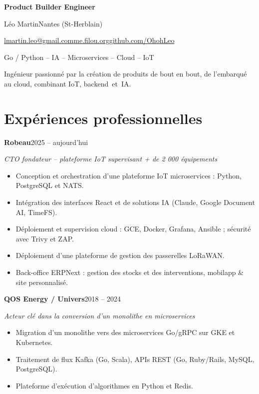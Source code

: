 \documentclass[a4paper,10pt]{article}
\newcommand{\experience}[3]{\textbf{#1}\hfill{\small\color{muted}#2}\par\textit{#3}\par}
\newcommand{\experiencegap}{\vspace{8pt plus 1fill}}
\begin{document}
{\fontsize{27}{30}\selectfont\bfseries Product Builder Engineer}\par
\vspace{6pt}
{\large\color{accent}Léo Martin}\hfill{\color{muted}Nantes (St-Herblain)}\par
\vspace{7pt}
\href{mailto:lmartin.leo@gmail.com}{lmartin.leo@gmail.com}\quad\textbar\quad\href{https://me.filou.org}{me.filou.org}\quad\textbar\quad\href{https://github.com/OhohLeo}{github.com/OhohLeo}\par
\vspace{8pt}
{\color{muted}Go / Python – IA – Microservices – Cloud – IoT}\par
\vspace{8pt}
Ingénieur passionné par la création de produits de bout en bout, de l'embarqué au cloud, combinant IoT, backend~et~IA.\par

\section{Expériences professionnelles}
\experience{Robeau}{2025 – aujourd'hui}{CTO fondateur – plateforme IoT supervisant + de 2 000 équipements}
\begin{itemize}
\item Conception et orchestration d'une plateforme IoT microservices : Python, PostgreSQL et NATS.
\item Intégration des interfaces React et de solutions IA (Claude, Google Document AI, TimeFS).
\item Déploiement et supervision cloud : GCE, Docker, Grafana, Ansible ; sécurité avec Trivy et ZAP.
\item Déploiement d'une plateforme de gestion des passerelles LoRaWAN.
\item Back-office ERPNext : gestion des stocks et des interventions, mobilapp \& site personnalisé.
\end{itemize}
\experiencegap

\experience{QOS Energy / Univers}{2018 – 2024}{Acteur clé dans la conversion d'un monolithe en microservices}
\begin{itemize}
\item Migration d'un monolithe vers des microservices Go/gRPC sur GKE et Kubernetes.
\item Traitement de flux Kafka (Go, Scala), APIs REST (Go, Ruby/Rails, MySQL, PostgreSQL).
\item Plateforme d'exécution d'algorithmes en Python et Redis.
\end{itemize}
\experiencegap
\end{document}
